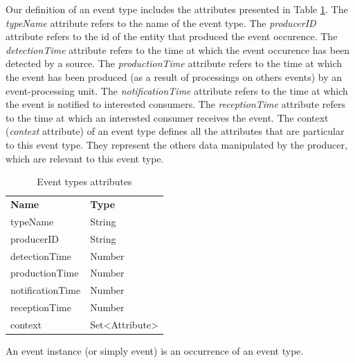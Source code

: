 Our definition of an event type includes the attributes presented in Table \ref{tab:evtAttributes}. The \textit{typeName} attribute refers to the name of the event type. The \textit{producerID} attribute refers to the id of the entity that produced the event occurence. The \textit{detectionTime} attribute refers to the time at which the event occurence has been detected by a source. The \textit{productionTime} attribute refers to the time at which the event has been produced (as a result of processings on others events) by an event-processing unit. The \textit{notificationTime} attribute refers to the time at which the event is notified to interested consumers. The \textit{receptionTime} attribute refers to the time at which an interested consumer receives the event. The context (\textit{context} attribute) of an event type defines all the attributes that are particular to this event type. They represent the others data manipulated by the producer, which are relevant to this event type.
\begin{table}[h!]
\begin{center}
\begin{tabular}{ll}
\rowcolor{tcA}
\textbf{\textcolor{tcB}{Name}} & \textbf{\textcolor{tcB}{Type}}\\
typeName & String\\
producerID & String\\
detectionTime & Number\\
productionTime & Number\\
notificationTime & Number\\
receptionTime & Number\\
context & Set<Attribute>
\end{tabular}
\caption {Event types attributes}
\label{tab:evtAttributes}
\end{center}
\end{table}
 An event instance (or simply event) is an occurrence of an event type.
 
